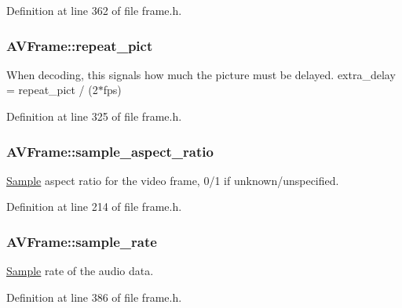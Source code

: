 Definition at line 362 of file frame.\+h.

\subsubsection[{\texorpdfstring{repeat\+\_\+pict}{repeat_pict}}]{ A\+V\+Frame\+::repeat\+\_\+pict}\hypertarget{struct_a_v_frame_aef11fd783ad17b6841af82efa07c859e}{}\label{struct_a_v_frame_aef11fd783ad17b6841af82efa07c859e}
When decoding, this signals how much the picture must be delayed. extra\+\_\+delay = repeat\+\_\+pict / (2$\ast$fps) 

Definition at line 325 of file frame.\+h.

\subsubsection[{\texorpdfstring{sample\+\_\+aspect\+\_\+ratio}{sample_aspect_ratio}}]{ A\+V\+Frame\+::sample\+\_\+aspect\+\_\+ratio}\hypertarget{struct_a_v_frame_a62f9c20541a83d37db7072126ff0060d}{}\label{struct_a_v_frame_a62f9c20541a83d37db7072126ff0060d}
\hyperlink{struct_sample}{Sample} aspect ratio for the video frame, 0/1 if unknown/unspecified. 

Definition at line 214 of file frame.\+h.

\subsubsection[{\texorpdfstring{sample\+\_\+rate}{sample_rate}}]{ A\+V\+Frame\+::sample\+\_\+rate}\hypertarget{struct_a_v_frame_ac85daa1316e1f47e78da0ca19b7c60e6}{}\label{struct_a_v_frame_ac85daa1316e1f47e78da0ca19b7c60e6}
\hyperlink{struct_sample}{Sample} rate of the audio data. 

Definition at line 386 of file frame.\+h.

